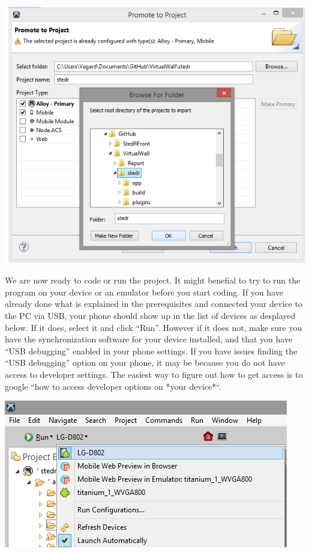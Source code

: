 \begin{center}
\includegraphics[scale=0.45]{guide/f3.png} 
\end{center}

We are now ready to code or run the project. It might benefial to try to run the program on your device or an emulator before you start coding. If you have already done what is explained in the prerequisites and connected your device to the PC via USB, your phone should show up in the list of devices as desplayed below. If it does, select it and click “Run”. However if it does not, make sure you have the synchronization software for your device installed, and that you have “USB debugging” enabled in your phone settings. If you have issues finding the “USB debugging” option on your phone, it may be because you do not have access to developer settings. The easiest way to figure out how to get access is to google “how to access developer options on *your device*“.

\begin{center}
\includegraphics[scale=0.45]{guide/f4.png} 
\end{center}

